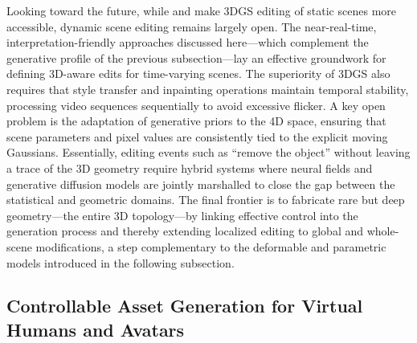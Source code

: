 \documentclass[11pt,a4paper]{article}
\begin{document}
Looking toward the future, while \cite{arxiv:2311.16037v1} and \cite{arxiv:2311.16037v1} make 3DGS editing of static scenes more accessible, dynamic scene editing remains largely open. The near-real-time, interpretation-friendly approaches discussed here---which complement the generative profile of the previous subsection---lay an effective groundwork for defining 3D-aware edits for time-varying scenes. The superiority of 3DGS also requires that style transfer and inpainting operations maintain temporal stability, processing video sequences sequentially to avoid excessive flicker. A key open problem is the adaptation of generative priors to the 4D space, ensuring that scene parameters and pixel values are consistently tied to the explicit moving Gaussians. Essentially, editing events such as ``remove the object'' without leaving a trace of the 3D geometry require hybrid systems where neural fields and generative diffusion models are jointly marshalled to close the gap between the statistical and geometric domains. The final frontier is to fabricate rare but deep geometry---the entire 3D topology---by linking effective control into the generation process and thereby extending localized editing to global and whole-scene modifications, a step complementary to the deformable and parametric models introduced in the following subsection.


\subsection{Controllable Asset Generation for Virtual Humans and Avatars}
\end{document}
